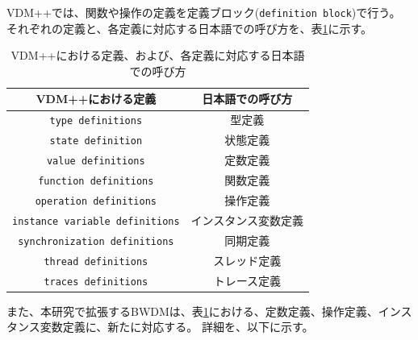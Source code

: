 \documentclass[uplatex, report, a4j, 10pt]{jsbook}
\newcommand\ttt[1]{\texttt{#1}}
\begin{document}
VDM++では、関数や操作の定義を定義ブロック(\ttt{definition block})で行う。
それぞれの定義と、各定義に対応する日本語での呼び方を、表\ref{tab:vdm_definition_japanese}に示す。
\begin{table}[t]
  \begin{center}
    \caption{VDM++における定義、および、各定義に対応する日本語での呼び方}
    \label{tab:vdm_definition_japanese}
    \begin{tabular}{c|c}
      VDM++における定義                   & 日本語での呼び方     \\
      \hline
      \hline
      \ttt{type definitions}              & 型定義               \\ \hline
      \ttt{state definition}              & 状態定義             \\ \hline
      \ttt{value definitions}             & 定数定義             \\ \hline
      \ttt{function definitions}          & 関数定義             \\ \hline
      \ttt{operation definitions}         & 操作定義             \\ \hline
      \ttt{instance variable definitions} & インスタンス変数定義 \\ \hline
      \ttt{synchronization definitions}   & 同期定義             \\ \hline
      \ttt{thread definitions}            & スレッド定義         \\ \hline
      \ttt{traces definitions}            & トレース定義
    \end{tabular}
  \end{center}
\end{table}

また、本研究で拡張するBWDMは、表\ref{tab:vdm_definition_japanese}における、定数定義、操作定義、インスタンス変数定義に、新たに対応する。
詳細を、以下に示す。
\end{document}
